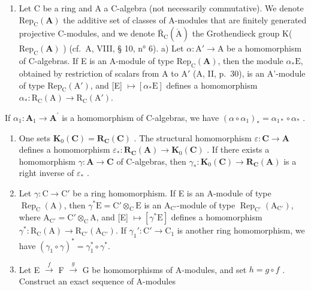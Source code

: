 \begin{enumerate}
\def\labelenumi{\arabic{enumi})}
\setcounter{enumi}{53}
\tightlist
\item
  Let C be a ring and A a C-algebra (not necessarily commutative). We denote \(\mathrm{Rep}_{\mathrm{C}}(\mathbf{A})\) the additive set of classes of A-modules that are finitely generated projective C-modules, and we denote \(\bar{\mathrm{R}}_{\mathrm{C}}(\mathring{\mathrm{A}})\) the Grothendieck group K( \(\mathrm{Rep}_{\mathrm{C}}(\mathbf{A})\) ) (cf.~A, VIII, § 10, n° 6). a) Let \(\alpha : \mathrm{A}' \to \mathrm{A}\) be a homomorphism of C-algebras. If E is an A-module of type \(\mathrm{Rep}_{\mathrm{C}}(\mathbf{A})\), then the module \(\alpha_{*}\mathrm{E}\), obtained by restriction of scalars from A to \(\mathrm{A}'\) (A, II, p.~30), is an A'-module of type \(\mathrm{Rep}_{\mathrm{C}}(\mathrm{A}')\), and {[}E{]} \(\mapsto [\alpha_{*}\mathrm{E}]\) defines a homomorphism \(\alpha_{*}: \mathrm{R}_{\mathrm{C}}(\mathrm{A}) \to \mathrm{R}_{\mathrm{C}}(\mathrm{A}')\).
\end{enumerate}

If \(\alpha_{1}:\mathbf{A}_{1}\to\mathbf{A}^{\prime}\) is a homomorphism of C-algebras, we have \((\alpha\circ\alpha_{1})_{*}=\alpha_{1*}\circ\alpha_{*}\) .

\begin{enumerate}
\def\labelenumi{\alph{enumi})}
\setcounter{enumi}{1}
\item
  One sets \(\mathbf{K}_0(\mathbf{C}) = \mathbf{R}_{\mathbf{C}}(\mathbf{C})\) . The structural homomorphism \(\varepsilon: \mathbf{C} \to \mathbf{A}\) defines a homomorphism \(\varepsilon_*: \mathbf{R}_{\mathbf{C}}(\mathbf{A}) \to \mathbf{K}_0(\mathbf{C})\) . If there exists a homomorphism \(\gamma: \mathbf{A} \to \mathbf{C}\) of C-algebras, then \(\gamma_*: \mathbf{K}_0(\mathbf{C}) \to \mathbf{R}_{\mathbf{C}}(\mathbf{A})\) is a right inverse of \(\varepsilon_*\) .
\item
  Let \(\gamma: \mathrm{C} \to \mathrm{C}'\) be a ring homomorphism. If E is an A-module of type \(\operatorname{Rep}_{\mathrm{C}}(\mathrm{A})\), then \(\gamma^{*}\mathrm{E} = \mathrm{C}' \otimes_{\mathrm{C}} \mathrm{E}\) is an \(\mathrm{A}_{\mathrm{C}'}\)-module of type \(\operatorname{Rep}_{\mathrm{C}'}(\mathrm{A}_{\mathrm{C}'})\), where \(\mathrm{A}_{\mathrm{C}'} = \mathrm{C}' \otimes_{\mathrm{C}} \mathrm{A}\), and {[}E{]} \(\mapsto [\gamma^{*}\mathrm{E}]\) defines a homomorphism \(\gamma^{*}: \mathrm{R}_{\mathrm{C}}(\mathrm{A}) \to \mathrm{R}_{\mathrm{C}'}(\mathrm{A}_{\mathrm{C}'})\). If \(\gamma_{1}': \mathrm{C}' \to \mathrm{C}_{1}\) is another ring homomorphism, we have \((\gamma_{1} \circ \gamma)^{*} = \gamma_{1}^{*} \circ \gamma^{*}\).
\item
  Let E \(\xrightarrow{f}\) F \(\xrightarrow{g}\) G be homomorphisms of A-modules, and set \(h = g \circ f\) . Construct an exact sequence of A-modules
\end{enumerate}

